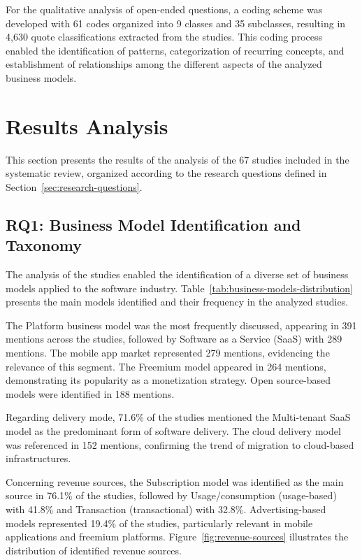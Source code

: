 \documentclass[journal]{IEEEtran}
\begin{document}
For the qualitative analysis of open-ended questions, a coding scheme was developed with 61 codes organized into 9 classes and 35 subclasses, resulting in 4,630 quote classifications extracted from the studies. This coding process enabled the identification of patterns, categorization of recurring concepts, and establishment of relationships among the different aspects of the analyzed business models.





\section{Results Analysis}\label{sec:analysis}

This section presents the results of the analysis of the 67 studies included in the systematic review, organized according to the research questions defined in Section~\ref{sec:research-questions}.

\subsection{RQ1: Business Model Identification and Taxonomy}

The analysis of the studies enabled the identification of a diverse set of business models applied to the software industry. Table~\ref{tab:business-models-distribution} presents the main models identified and their frequency in the analyzed studies.



The Platform business model was the most frequently discussed, appearing in 391 mentions across the studies, followed by Software as a Service (SaaS) with 289 mentions. The mobile app market represented 279 mentions, evidencing the relevance of this segment. The Freemium model appeared in 264 mentions, demonstrating its popularity as a monetization strategy. Open source-based models were identified in 188 mentions.

Regarding delivery mode, 71.6\% of the studies mentioned the Multi-tenant SaaS model as the predominant form of software delivery. The cloud delivery model was referenced in 152 mentions, confirming the trend of migration to cloud-based infrastructures.

Concerning revenue sources, the Subscription model was identified as the main source in 76.1\% of the studies, followed by Usage/consumption (usage-based) with 41.8\% and Transaction (transactional) with 32.8\%. Advertising-based models represented 19.4\% of the studies, particularly relevant in mobile applications and freemium platforms. Figure~\ref{fig:revenue-sources} illustrates the distribution of identified revenue sources.
\end{document}
